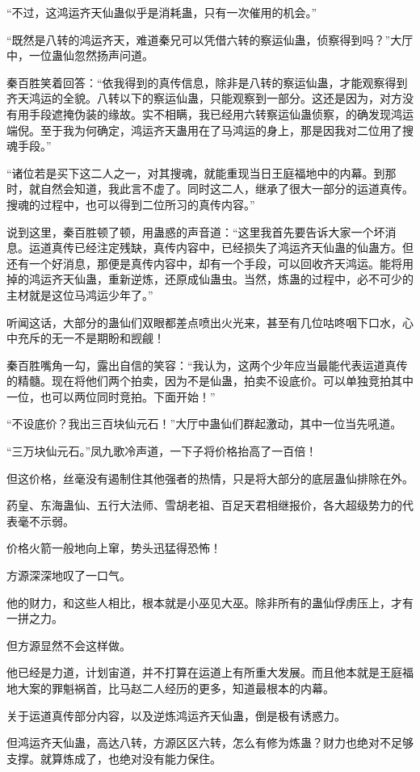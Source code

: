 \begin{this_body}
“不过，这鸿运齐天仙蛊似乎是消耗蛊，只有一次催用的机会。”

“既然是八转的鸿运齐天，难道秦兄可以凭借六转的察运仙蛊，侦察得到吗？”大厅中，一位蛊仙忽然扬声问道。

秦百胜笑着回答：“依我得到的真传信息，除非是八转的察运仙蛊，才能观察得到齐天鸿运的全貌。八转以下的察运仙蛊，只能观察到一部分。这还是因为，对方没有用手段遮掩伪装的缘故。实不相瞒，我已经用六转察运仙蛊侦察，的确发现鸿运端倪。至于我为何确定，鸿运齐天蛊用在了马鸿运的身上，那是因我对二位用了搜魂手段。”

“诸位若是买下这二人之一，对其搜魂，就能重现当日王庭福地中的内幕。到那时，就自然会知道，我此言不虚了。同时这二人，继承了很大一部分的运道真传。搜魂的过程中，也可以得到二位所习的真传内容。”

说到这里，秦百胜顿了顿，用蛊惑的声音道：“这里我首先要告诉大家一个坏消息。运道真传已经注定残缺，真传内容中，已经损失了鸿运齐天仙蛊的仙蛊方。但还有一个好消息，那便是真传内容中，却有一个手段，可以回收齐天鸿运。能将用掉的鸿运齐天仙蛊，重新逆炼，还原成仙蛊虫。当然，炼蛊的过程中，必不可少的主材就是这位马鸿运少年了。”

听闻这话，大部分的蛊仙们双眼都差点喷出火光来，甚至有几位咕咚咽下口水，心中充斥的无一不是期盼和觊觎！

秦百胜嘴角一勾，露出自信的笑容：“我认为，这两个少年应当最能代表运道真传的精髓。现在将他们两个拍卖，因为不是仙蛊，拍卖不设底价。可以单独竞拍其中一位，也可以两位同时竞拍。下面开始！”

“不设底价？我出三百块仙元石！”大厅中蛊仙们群起激动，其中一位当先吼道。

“三万块仙元石。”凤九歌冷声道，一下子将价格抬高了一百倍！

但这价格，丝毫没有遏制住其他强者的热情，只是将大部分的底层蛊仙排除在外。

药皇、东海蛊仙、五行大法师、雪胡老祖、百足天君相继报价，各大超级势力的代表毫不示弱。

价格火箭一般地向上窜，势头迅猛得恐怖！

方源深深地叹了一口气。

他的财力，和这些人相比，根本就是小巫见大巫。除非所有的蛊仙俘虏压上，才有一拼之力。

但方源显然不会这样做。

他已经是力道，计划宙道，并不打算在运道上有所重大发展。而且他本就是王庭福地大案的罪魁祸首，比马赵二人经历的更多，知道最根本的内幕。

关于运道真传部分内容，以及逆炼鸿运齐天仙蛊，倒是极有诱惑力。

但鸿运齐天仙蛊，高达八转，方源区区六转，怎么有修为炼蛊？财力也绝对不足够支撑。就算炼成了，也绝对没有能力保住。


\end{this_body}
